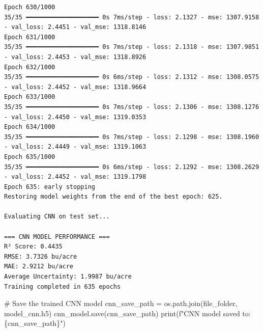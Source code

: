 \documentclass[
  letterpaper,
  DIV=11,
  numbers=noendperiod]{scrreprt}
\newenvironment{Shaded}{\begin{snugshade}}{\end{snugshade}}
\newcommand{\BuiltInTok}[1]{\textcolor[rgb]{0.00,0.23,0.31}{#1}}
\newcommand{\CommentTok}[1]{\textcolor[rgb]{0.37,0.37,0.37}{#1}}
\newcommand{\NormalTok}[1]{\textcolor[rgb]{0.00,0.23,0.31}{#1}}
\newcommand{\OperatorTok}[1]{\textcolor[rgb]{0.37,0.37,0.37}{#1}}
\newcommand{\SpecialCharTok}[1]{\textcolor[rgb]{0.37,0.37,0.37}{#1}}
\newcommand{\SpecialStringTok}[1]{\textcolor[rgb]{0.13,0.47,0.30}{#1}}
\newcommand{\StringTok}[1]{\textcolor[rgb]{0.13,0.47,0.30}{#1}}
\begin{document}
\begin{verbatim}
Epoch 630/1000
35/35 ━━━━━━━━━━━━━━━━━━━━ 0s 7ms/step - loss: 2.1327 - mse: 1307.9158 - val_loss: 2.4451 - val_mse: 1318.8146
Epoch 631/1000
35/35 ━━━━━━━━━━━━━━━━━━━━ 0s 7ms/step - loss: 2.1318 - mse: 1307.9851 - val_loss: 2.4453 - val_mse: 1318.8926
Epoch 632/1000
35/35 ━━━━━━━━━━━━━━━━━━━━ 0s 6ms/step - loss: 2.1312 - mse: 1308.0575 - val_loss: 2.4452 - val_mse: 1318.9664
Epoch 633/1000
35/35 ━━━━━━━━━━━━━━━━━━━━ 0s 7ms/step - loss: 2.1306 - mse: 1308.1276 - val_loss: 2.4450 - val_mse: 1319.0353
Epoch 634/1000
35/35 ━━━━━━━━━━━━━━━━━━━━ 0s 7ms/step - loss: 2.1298 - mse: 1308.1960 - val_loss: 2.4449 - val_mse: 1319.1063
Epoch 635/1000
35/35 ━━━━━━━━━━━━━━━━━━━━ 0s 6ms/step - loss: 2.1292 - mse: 1308.2629 - val_loss: 2.4452 - val_mse: 1319.1798
Epoch 635: early stopping
Restoring model weights from the end of the best epoch: 625.

Evaluating CNN on test set...

=== CNN MODEL PERFORMANCE ===
R² Score: 0.4435
RMSE: 3.7326 bu/acre
MAE: 2.9212 bu/acre
Average Uncertainty: 1.9987 bu/acre
Training completed in 635 epochs
\end{verbatim}

\begin{Shaded}
\begin{Highlighting}[]
\CommentTok{\# Save the trained CNN model}
\NormalTok{cnn\_save\_path }\OperatorTok{=}\NormalTok{ os.path.join(file\_folder, }\StringTok{\textquotesingle{}model\_cnn.h5\textquotesingle{}}\NormalTok{)}
\NormalTok{cnn\_model.save(cnn\_save\_path)}
\BuiltInTok{print}\NormalTok{(}\SpecialStringTok{f"CNN model saved to: }\SpecialCharTok{\{}\NormalTok{cnn\_save\_path}\SpecialCharTok{\}}\SpecialStringTok{"}\NormalTok{)}
\end{Highlighting}
\end{Shaded}
\end{document}

